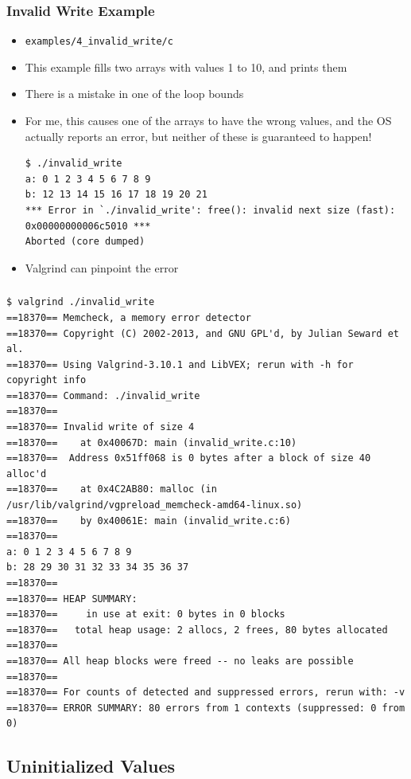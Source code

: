 \documentclass{beamer}
\begin{document}
\begin{frame}[fragile]
  \frametitle{Invalid Write Example}
  \begin{itemize}
    \item \texttt{examples/4\_invalid\_write/c}
      \item This example fills two arrays with values 1 to 10, and prints them
        \item There is a mistake in one of the loop bounds
        \item For me, this causes one of the arrays to have the wrong values, and the OS actually reports an error, but neither of these is guaranteed to happen!
  \begin{lstlisting}
$ ./invalid_write
a: 0 1 2 3 4 5 6 7 8 9
b: 12 13 14 15 16 17 18 19 20 21
*** Error in `./invalid_write': free(): invalid next size (fast): 0x00000000006c5010 ***
Aborted (core dumped)
  \end{lstlisting}
  \item Valgrind can pinpoint the error
  \end{itemize}
\end{frame}

\begin{frame}[fragile]
  \frametitle{}
  \begin{lstlisting}
$ valgrind ./invalid_write
==18370== Memcheck, a memory error detector
==18370== Copyright (C) 2002-2013, and GNU GPL'd, by Julian Seward et al.
==18370== Using Valgrind-3.10.1 and LibVEX; rerun with -h for copyright info
==18370== Command: ./invalid_write
==18370==
==18370== Invalid write of size 4
==18370==    at 0x40067D: main (invalid_write.c:10)
==18370==  Address 0x51ff068 is 0 bytes after a block of size 40 alloc'd
==18370==    at 0x4C2AB80: malloc (in /usr/lib/valgrind/vgpreload_memcheck-amd64-linux.so)
==18370==    by 0x40061E: main (invalid_write.c:6)
==18370==
a: 0 1 2 3 4 5 6 7 8 9
b: 28 29 30 31 32 33 34 35 36 37
==18370==
==18370== HEAP SUMMARY:
==18370==     in use at exit: 0 bytes in 0 blocks
==18370==   total heap usage: 2 allocs, 2 frees, 80 bytes allocated
==18370==
==18370== All heap blocks were freed -- no leaks are possible
==18370==
==18370== For counts of detected and suppressed errors, rerun with: -v
==18370== ERROR SUMMARY: 80 errors from 1 contexts (suppressed: 0 from 0)
  \end{lstlisting}
\end{frame}

\subsection{Uninitialized Values}
\end{document}
